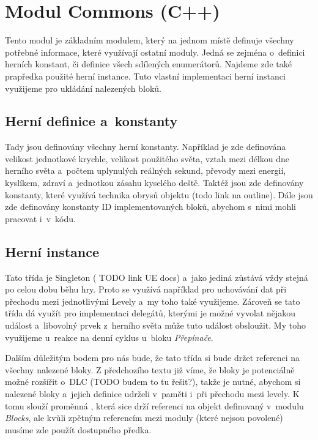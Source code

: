 
\section{Modul Commons (C++)}

Tento modul je základním modulem, který na jednom místě definuje všechny potřebné informace, které využívají ostatní moduly. Jedná se zejména o~definici herních konstant, či definice všech sdílených enumerátorů. Najdeme zde také prapředka použité herní instance. Tuto vlastní implementaci herní instanci využijeme pro ukládání nalezených bloků.

\subsection{Herní definice a~konstanty}


Tady jsou definovány všechny herní konstanty. Například je zde definována velikost jednotkové krychle, velikost použitého světa, vztah mezi délkou dne herního světa a~počtem uplynulých reálných sekund, převody mezi energií, kyslíkem, zdraví a~jednotkou zásahu kyselého deště. Taktéž jsou zde definovány konstanty, které využívá technika obrysů objektu (todo link na outline). Dále jsou zde definovány konstanty ID implementovaných bloků, abychom s~nimi mohli pracovat i~v~kódu.

\subsection{Herní instance}

Tato třída je Singleton ( TODO link UE docs) a~jako jediná zůstává vždy stejná po celou dobu běhu hry. Proto se využívá například pro uchovávání dat při přechodu mezi jednotlivými Levely a~my toho také využijeme. Zároveň se tato třída dá využít pro implementaci delegátů, kterými je možné vyvolat nějakou událost a~libovolný prvek z~herního světa může tuto událost obsloužit. My toho využijeme u~reakce na denní cyklus u~bloku \textit{Přepínače}.

Dalším důležitým bodem pro nás bude, že tato třída si bude držet referenci na všechny nalezené bloky. Z předchozího textu již víme, že bloky je potenciálně možné rozšířit o~DLC (TODO budem to tu řešit?), takže je nutné, abychom si nalezené bloky a~jejich definice udrželi v~paměti i~při přechodu mezi levely. K tomu slouží proměnná  , která sice  drží referenci na objekt definovaný v~modulu \textit{Blocks}, ale kvůli zpětným referencím mezi moduly (které nejsou povolené) musíme zde použít dostupného předka.

